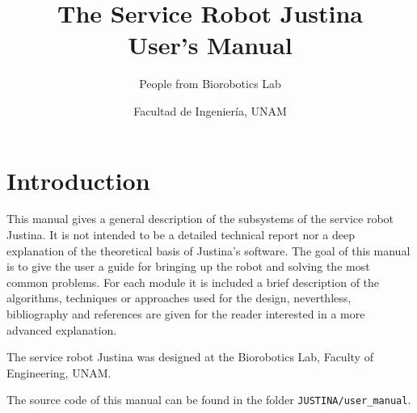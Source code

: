 \documentclass[letterpaper,10pt]{article}
\title{The Service Robot Justina\\User's Manual}
\author{People from Biorobotics Lab}%
\date{Facultad de Ingeniería, UNAM}
\begin{document}
\renewcommand{\BOthers}[1]{et al.\hbox{}}
\maketitle
\tableofcontents

\section{Introduction}
This manual gives a general description of the subsystems of the service robot Justina. It is not intended to be a detailed technical report nor a deep explanation of the theoretical basis of Justina's software. The goal of this manual is to give the user a guide for bringing up the robot and solving the most common problems. For each module it is included a brief description of the algorithms, techniques or approaches used for the design, neverthless, bibliography and references are given for the reader interested in a more advanced explanation.

The service robot Justina was designed at the Biorobotics Lab, Faculty of Engineering, UNAM. 

The source code of this manual can be found in the folder \texttt{JUSTINA/user\_manual}.
\end{document}
